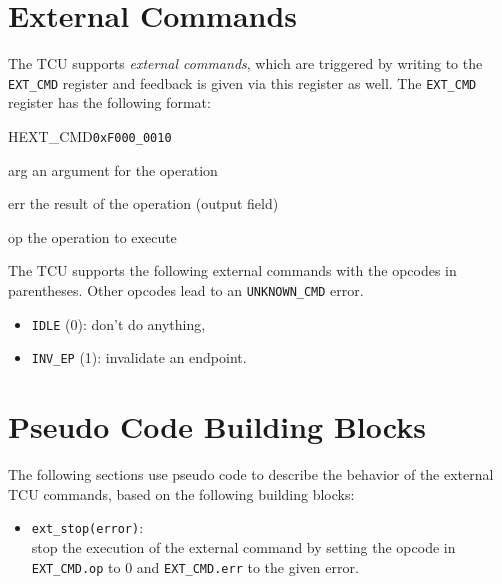 \section{External Commands}

The TCU supports \emph{external commands}, which are triggered by writing to the \texttt{EXT\_CMD}
register and feedback is given via this register as well. The \texttt{EXT\_CMD} register has the
following format:

\begin{register}{H}{EXT\_CMD}{\texttt{0xF000\_0010}}
  \regnewline%
  \begin{regdesc}\begin{reglist}
    \item[arg] an argument for the operation
    \item[err] the result of the operation (output field)
    \item[op] the operation to execute
  \end{reglist}\end{regdesc}
\end{register}

The TCU supports the following external commands with the opcodes in parentheses. Other opcodes lead
to an \texttt{UNKNOWN\_CMD} error.

\begin{itemize}
  \item \texttt{IDLE} (0): don't do anything,
  \item \texttt{INV\_EP} (1): invalidate an endpoint.
\end{itemize}

\section{Pseudo Code Building Blocks}
\label{sec:extcmdspseudo}

The following sections use pseudo code to describe the behavior of the external TCU commands, based
on the following building blocks:

\begin{itemize}
  \item \texttt{ext\_stop(error)}:\\
  stop the execution of the external command by setting the opcode in \texttt{EXT\_CMD.op} to 0 and
  \texttt{EXT\_CMD.err} to the given error.
\end{itemize}

